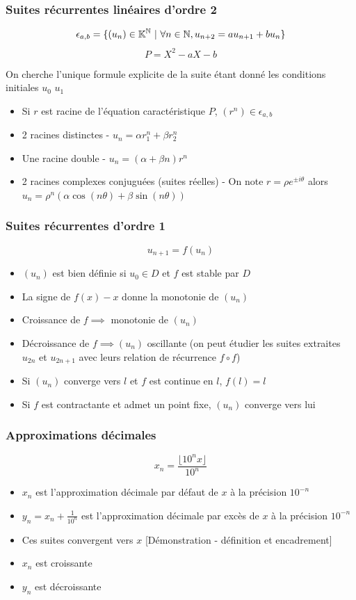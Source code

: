 \documentclass[openany]{book}
\begin{document}
\subsubsection{Suites récurrentes linéaires d'ordre 2}
\[ \epsilon_{a, b} = \{ (u_n) \in \mathbb{K}^\mathbb{N} \text{ } | \text{ } \forall n \in \mathbb{N}, u_{n+2} = au_{n+1} + bu_n \} \]
\[ P = X^2 - aX - b \]

On cherche l'unique formule explicite de la suite étant donné les conditions initiales $u_0$ $u_1$ 

\begin{itemize}
    \item Si $r$ est racine de l'équation caractéristique $P$, $ (r^n) \in \epsilon_{a,b} $
    \item 2 racines distinctes - $ u_n = \alpha r_1^n + \beta r_2^n $
    \item Une racine double - $ u_n = (\alpha + \beta n) r^n $
    \item 2 racines complexes conjuguées (suites réelles) - On note $ r = \rho e^{\pm i \theta} $ alors $ u_n = \rho^n(\alpha \cos(n \theta) + \beta \sin(n\theta)) $
\end{itemize}

\subsubsection{Suites récurrentes d'ordre 1}
\[ u_{n+1} = f(u_n) \]

\begin{itemize}
    \item $(u_n)$ est bien définie si $u_0 \in D$ et $f$ est stable par $D$
    \item La signe de $f(x) - x$ donne la monotonie de $(u_n)$
    \item Croissance de $f \implies$ monotonie de $(u_n)$
    \item Décroissance de $f \implies (u_n)$ oscillante (on peut étudier les suites extraites $u_{2n}$ et $u_{2n+1}$ avec leurs relation de récurrence $f \circ f$)
    \item Si $(u_n)$ converge vers $l$ et $f$ est continue en $l$, $f(l) = l$
    \item Si $f$ est contractante et admet un point fixe, $(u_n)$ converge vers lui
\end{itemize}

\subsubsection{Approximations décimales}
\[ x_n = \frac{\lfloor 10^n x \rfloor}{10^n} \]
\begin{itemize}
    \item $x_n$ est l'approximation décimale par défaut de $x$ à la précision $10^{-n}$
    \item $y_n = x_n + \frac{1}{10^n}$ est l'approximation décimale par excès de $x$ à la précision $10^{-n}$
    \item Ces suites convergent vers $x$ [Démonstration - définition  et encadrement]
    \item $x_n$ est croissante
    \item $y_n$ est décroissante
\end{itemize}
\end{document}
